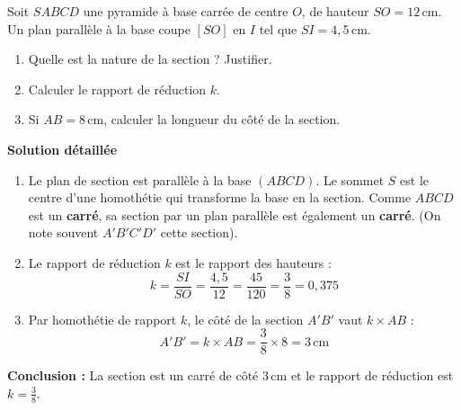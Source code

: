 \documentclass[11pt]{article}
\begin{document}
\begin{exoresolu}
    Soit $SABCD$ une pyramide à base carrée de centre $O$, de hauteur $SO = 12\,\text{cm}$. Un plan parallèle à la base coupe $[SO]$ en $I$ tel que $SI = 4,5\,\text{cm}$.
    \begin{enumerate}
        \item Quelle est la nature de la section ? Justifier.
        \item Calculer le rapport de réduction $k$.
        \item Si $AB = 8\,\text{cm}$, calculer la longueur du côté de la section.
    \end{enumerate}
    \tcblower
    \textbf{Solution détaillée}
    \begin{enumerate}
        \item Le plan de section est parallèle à la base $(ABCD)$. Le sommet $S$ est le centre d'une homothétie qui transforme la base en la section. Comme $ABCD$ est un \textbf{carré}, sa section par un plan parallèle est également un \textbf{carré}. (On note souvent $A'B'C'D'$ cette section).
        \item Le rapport de réduction $k$ est le rapport des hauteurs :
            \[ k = \frac{SI}{SO} = \frac{4,5}{12} = \frac{45}{120} = \frac{3}{8} = 0,375 \]
        \item Par homothétie de rapport $k$, le côté de la section $A'B'$ vaut $k \times AB$ :
            \[ A'B' = k \times AB = \frac{3}{8} \times 8 = 3\,\text{cm} \]
    \end{enumerate}
    \textbf{Conclusion :} La section est un carré de côté $3\,\text{cm}$ et le rapport de réduction est $k = \frac{3}{8}$.
\end{exoresolu}
\end{document}
